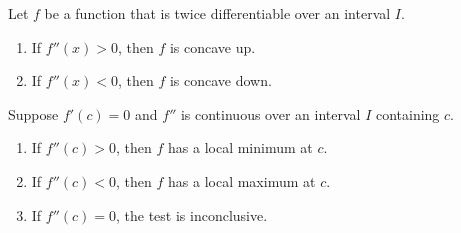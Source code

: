 \documentclass[12pt]{amsart}
\begin{document}
\begin{theorem}
	Let $f$ be a function that is twice differentiable over an interval $I$.
	\begin{enumerate}
		\item If $f''(x) > 0$, then $f$ is concave up.
		\item If $f''(x) < 0$, then $f$ is concave down.
	\end{enumerate}
\end{theorem}


\begin{theorem}
	Suppose $f'(c) = 0$ and $f''$ is continuous over an interval $I$ containing $c$.
	\begin{enumerate}
		\item If $f''(c)>0$, then $f$ has a local minimum at $c$.
		\item If $f''(c)<0$, then $f$ has a local maximum at $c$.
		\item If $f''(c)=0$, the test is inconclusive.
	\end{enumerate}
\end{theorem}
\end{document}
